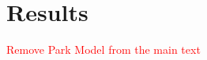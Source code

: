 \documentclass[../main.tex]{subfiles}
\begin{document}
\section{Results}

\textcolor{red}{Remove Park Model from the main text}




\newpage

\FloatBarrier


\FloatBarrier



\FloatBarrier

% 
\end{document}
